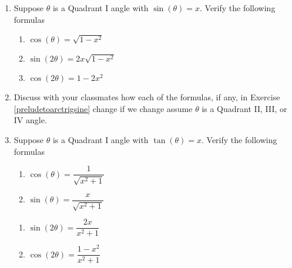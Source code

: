 \begin{enumerate}

\setcounter{enumi}{\value{HW}}

\item  \label{preludetoarctrigsine} Suppose $\theta$ is a Quadrant I angle with $\sin(\theta) = x$. Verify the following formulas

\begin{multicols}{3}

\begin{enumerate}

\item  $\cos(\theta) = \sqrt{1-x^2}$

\item  $\sin(2\theta) = 2x\sqrt{1-x^2}$

\item $\cos(2\theta) = 1 - 2x^2$

\end{enumerate}

\end{multicols}

\item  Discuss with your classmates how each of the formulas, if any, in Exercise \ref{preludetoarctrigsine} change if we change assume $\theta$ is a Quadrant II, III, or IV angle.

\item  \label{preludetoarctrigtan} Suppose $\theta$ is a Quadrant I angle with $\tan(\theta) = x$. Verify the following formulas

\begin{multicols}{2}

\begin{enumerate}

\item $\cos(\theta) = \dfrac{1}{\sqrt{x^2+1}}$
\item $\sin(\theta) = \dfrac{x}{\sqrt{x^2+1}}$

\setcounter{HWindent}{\value{enumii}}

\end{enumerate}

\end{multicols}

\begin{multicols}{2}

\begin{enumerate}

\setcounter{enumii}{\value{HWindent}}

\item $\sin(2\theta) = \dfrac{2x}{x^2+1}$
\item $\cos(2\theta) = \dfrac{1-x^2}{x^2+1}$


\end{enumerate}
\end{multicols}
\end{enumerate}
